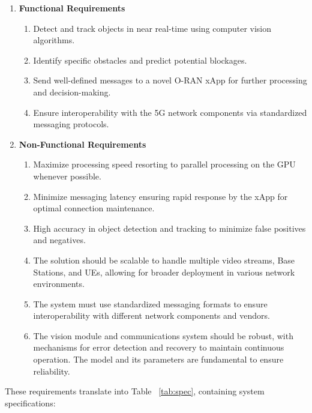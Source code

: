\begin{enumerate}
    \item \textbf{Functional Requirements}
    \begin{enumerate}
        \item Detect and track objects in near real-time using computer vision algorithms.
        \item Identify specific obstacles and predict potential blockages.
        \item Send well-defined messages to a novel O-RAN xApp for further processing and decision-making.
        \item Ensure interoperability with the 5G network components via standardized messaging protocols. %
    \end{enumerate}
    \item \textbf{Non-Functional Requirements}
    \begin{enumerate}
        \item Maximize processing speed resorting to parallel processing on the GPU whenever possible\@.
        \item Minimize messaging latency ensuring rapid response by the xApp for optimal connection maintenance.
        \item High accuracy in object detection and tracking to minimize false positives and negatives.
        \item The solution should be scalable to handle multiple video streams, Base Stations, and UEs, allowing for broader deployment in various network environments.
        \item The system must use standardized messaging formats to ensure interoperability with different network components and vendors.
        \item The vision module and communications system should be robust, with mechanisms for error detection and recovery to maintain continuous operation.
        The model and its parameters are fundamental to ensure reliability. %
    \end{enumerate}
\end{enumerate}

These requirements translate into Table ~\ref{tab:spec}, containing system specifications:


